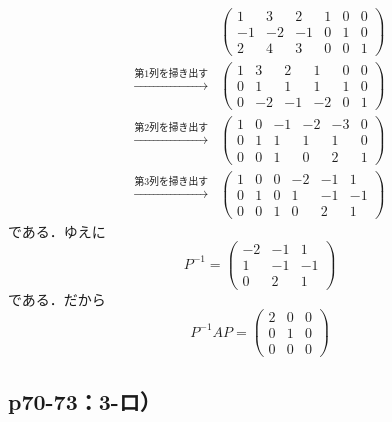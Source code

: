 \documentclass[uplatex,dvipdfmx,a4paper,11pt,fleqn]{jsarticle}
\begin{document}
    \begin{leftbar}
    \begin{align*} 
    &
    \left( 
        \begin{array}{ccc|ccc}
        1 & 3 & 2 & 1 & 0 & 0 \\
        -1 & -2 & -1 & 0 & 1 & 0 \\
        2 & 4 & 3 &  0 & 0 & 1
        \end{array}
        \right) \\
       \xrightarrow{\text{第$1$列を掃き出す}} &
    \left( 
        \begin{array}{ccc|ccc}
        1 & 3 & 2 & 1 & 0 & 0 \\
        0 & 1 & 1 & 1 & 1 & 0 \\
        0 & -2 & -1 &  -2 & 0 & 1
        \end{array}
        \right) \\
       \xrightarrow{\text{第$2$列を掃き出す}} &
       \left( 
           \begin{array}{ccc|ccc}
           1 & 0 & -1 & -2 & -3 & 0 \\
           0 & 1 & 1 & 1 & 1 & 0 \\
           0 & 0 & 1 &  0 & 2 & 1 
           \end{array}
           \right) \\
       \xrightarrow{\text{第$3$列を掃き出す}} &
       \left( 
           \begin{array}{ccc|ccc}
            1 & 0 & 0 & -2 & -1 & 1 \\
            0 & 1 & 0 & 1 & -1 & -1 \\
            0 & 0 & 1 &  0 & 2 & 1 
           \end{array}
           \right) 
        \end{align*}
        である．ゆえに
        \[
            P^{-1} = \begin{pmatrix} -2 & -1 & 1\\ 1 & -1 & -1 \\ 0 & 2 & 1 \end{pmatrix}
        \]
        である．だから
        \[
            P^{-1} A P = \begin{pmatrix} 2 & 0 & 0 \\ 0 & 1 & 0 \\ 0 & 0 & 0 \end{pmatrix}
        \]
    \end{leftbar}


    \subsection*{p70-73：3-ロ）}
\end{document}
